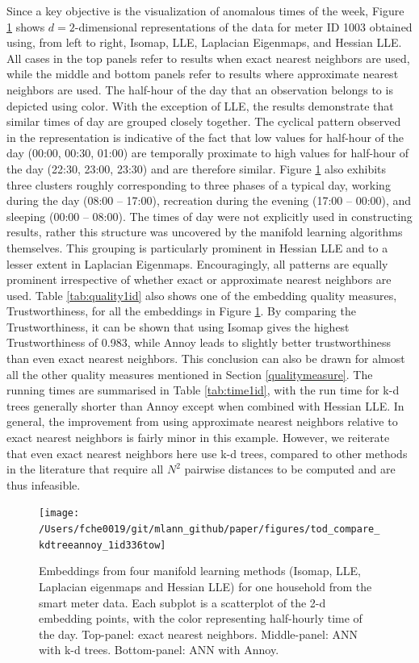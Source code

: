 \documentclass[11pt,a4paper,]{article}
\begin{document}
Since a key objective is the visualization of anomalous times of the week, Figure \ref{fig:todplot} shows \(d=2\)-dimensional representations of the data for meter ID 1003 obtained using, from left to right, Isomap, LLE, Laplacian Eigenmaps, and Hessian LLE. All cases in the top panels refer to results when exact nearest neighbors are used, while the middle and bottom panels refer to results where approximate nearest neighbors are used. The half-hour of the day that an observation belongs to is depicted using color. With the exception of LLE, the results demonstrate that similar times of day are grouped closely together. The cyclical pattern observed in the representation is indicative of the fact that low values for half-hour of the day (00:00, 00:30, 01:00) are temporally proximate to high values for half-hour of the day (22:30, 23:00, 23:30) and are therefore similar. Figure \ref{fig:todplot} also exhibits three clusters roughly corresponding to three phases of a typical day, working during the day (08:00 -- 17:00), recreation during the evening (17:00 -- 00:00), and sleeping (00:00 -- 08:00). The times of day were not explicitly used in constructing results, rather this structure was uncovered by the manifold learning algorithms themselves. This grouping is particularly prominent in Hessian LLE and to a lesser extent in Laplacian Eigenmaps. Encouragingly, all patterns are equally prominent irrespective of whether exact or approximate nearest neighbors are used.
Table \ref{tab:quality1id} also shows one of the embedding quality measures, Trustworthiness, for all the embeddings in Figure \ref{fig:todplot}. By comparing the Trustworthiness, it can be shown that using Isomap gives the highest Trustworthiness of 0.983, while Annoy leads to slightly better trustworthiness than even exact nearest neighbors. This conclusion can also be drawn for almost all the other quality measures mentioned in Section \ref{qualitymeasure}. The running times are summarised in Table \ref{tab:time1id}, with the run time for k-d trees generally shorter than Annoy except when combined with Hessian LLE. In general, the improvement from using approximate nearest neighbors relative to exact nearest neighbors is fairly minor in this example. However, we reiterate that even exact nearest neighbors here use k-d trees, compared to other methods in the literature that require all \(N^2\) pairwise distances to be computed and are thus infeasible.

\begin{figure}

{\centering \texttt{[image: /Users/fche0019/git/mlann\_github/paper/figures/tod\_compare\_kdtreeannoy\_1id336tow]} 

}

\caption{Embeddings from four manifold learning methods (Isomap, LLE, Laplacian eigenmaps and Hessian LLE) for one household from the smart meter data. Each subplot is a scatterplot of the 2-d embedding points, with the color representing half-hourly time of the day. Top-panel: exact nearest neighbors. Middle-panel: ANN with k-d trees. Bottom-panel: ANN with Annoy.}\label{fig:todplot}
\end{figure}
\end{document}
